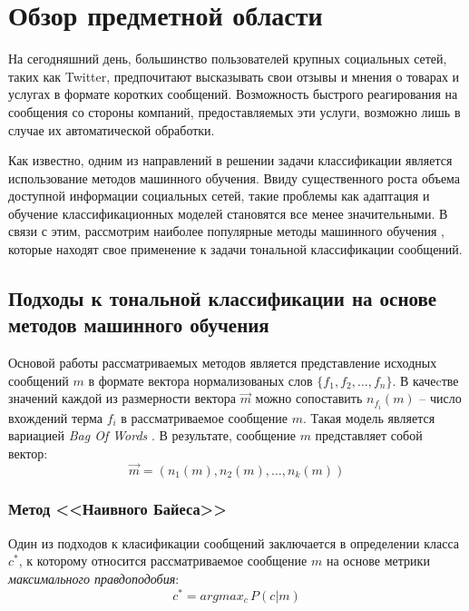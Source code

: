 \newpage
\section{Обзор предметной области}
    На сегодняшний день, большинство пользователей крупных социальных сетей,
    таких как Twitter, предпочитают высказывать свои отзывы и мнения о товарах
    и услугах в формате коротких сообщений. Возможность быстрого реагирования
    на сообщения со стороны компаний, предоставляемых эти услуги, возможно лишь
    в случае их автоматической обработки.

    Как известно, одним из направлений в решении задачи классификации является
    использование методов машинного обучения. Ввиду существенного роста объема
    доступной информации социальных сетей, такие проблемы как адаптация и
    обучение классификационных моделей становятся все менее значительными.
    В связи с этим, рассмотрим наиболее популярные методы машинного обучения \cite{svmAdvantages},
    которые находят свое применение к задачи тональной классификации сообщений.

    \subsection{Подходы к тональной классификации на основе методов машинного обучения}
        Основой работы рассматриваемых методов является представление исходных
        сообщений $m$ в формате вектора нормализованых слов $\{f_1, f_2, \ldots, f_n\}$.
        В качеcтве значений каждой из размерности вектора $\vec{m}$ можно сопоставить
        $n_{f_i}(m)$ -- число вхождений терма $f_i$ в рассматриваемое сообщение $m$.
        Такая модель является вариацией {\it Bag Of Words} \cite{svmAdvantages}.
        В результате, сообщение $m$ представляет собой вектор:
        \begin{equation}
            \vec{m} = (n_1(m), n_2(m), \ldots, n_k(m)) \nonumber
        \end{equation}

        \subsubsection{Метод <<Наивного Байеса>>}
        Один из подходов к класификации сообщений заключается в определении класса $c^{*}$,
        к которому относится рассматриваемое сообщение $m$ на основе метрики
        {\it максимального правдоподобия}:
        \begin{equation}
            c^{*} = argmax_c \hspace{2pt} P(c|m) \nonumber
        \end{equation}

